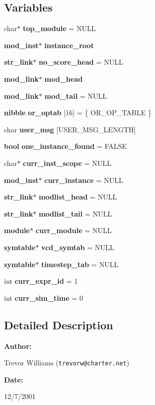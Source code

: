 \subsection*{Variables}
\begin{CompactItemize}
\item 
char$\ast$ {\bf top\_\-module} = NULL
\item 
{\bf mod\_\-inst}$\ast$ {\bf instance\_\-root}
\item 
{\bf str\_\-link}$\ast$ {\bf no\_\-score\_\-head} = NULL
\item 
{\bf mod\_\-link}$\ast$ {\bf mod\_\-head}
\item 
{\bf mod\_\-link}$\ast$ {\bf mod\_\-tail} = NULL
\item 
{\bf nibble} {\bf or\_\-optab} [16] = \{ OR\_\-OP\_\-TABLE \}
\item 
char {\bf user\_\-msg} [USER\_\-MSG\_\-LENGTH]
\item 
{\bf bool} {\bf one\_\-instance\_\-found} = FALSE
\item 
char$\ast$ {\bf curr\_\-inst\_\-scope} = NULL
\item 
{\bf mod\_\-inst}$\ast$ {\bf curr\_\-instance} = NULL
\item 
{\bf str\_\-link}$\ast$ {\bf modlist\_\-head} = NULL
\item 
{\bf str\_\-link}$\ast$ {\bf modlist\_\-tail} = NULL
\item 
{\bf module}$\ast$ {\bf curr\_\-module} = NULL
\item 
{\bf symtable}$\ast$ {\bf vcd\_\-symtab} = NULL
\item 
{\bf symtable}$\ast$ {\bf timestep\_\-tab} = NULL
\item 
int {\bf curr\_\-expr\_\-id} = 1
\item 
int {\bf curr\_\-sim\_\-time} = 0
\end{CompactItemize}


\subsection{Detailed Description}


\begin{Desc}
\item[{\bf Author: }]\par
Trevor Williams ({\tt trevorw@charter.net}) \end{Desc}
\begin{Desc}
\item[{\bf Date: }]\par
12/7/2001

\end{Desc}


